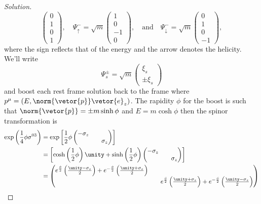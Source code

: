 \begin{proof}[Solution]
\begin{equation*}
\begin{pmatrix}
           0 \\ 1\\0 \\ 1
       \end{pmatrix},
       \quad
       \Psi^-_\uparrow = \sqrt{m} \begin{pmatrix}
           1 \\ 0\\-1 \\ 0
       \end{pmatrix},
       \quad\text{and}\quad
       \Psi^-_\downarrow = \sqrt{m} \begin{pmatrix}
           0 \\ 1\\0 \\-1
       \end{pmatrix},
   \end{equation*}
   where the sign reflects that of the energy and the arrow denotes the helicity. We'll write 
   \begin{equation*}
      \Psi^\pm_{s} = \sqrt{m}\begin{pmatrix} \xi_s\\\pm\xi_s \end{pmatrix}
   \end{equation*}
   and boost each rest frame solution back to the frame where \(p^\mu = (E, \norm{\vetor{p}} \vetor{e}_z)\). The rapidity \(\phi\) for the boost is such that \(\norm{\vetor{p}} = \pm m \sinh\phi\) and \(E = m \cosh\phi\) then the spinor transformation is
   \begin{align*}
      \exp\left(\frac14 \phi \sigma^{03}\right) 
      &= \exp\left[\frac12 \phi \begin{pmatrix}
            - \sigma_z && \\
                       && \sigma_z
      \end{pmatrix}\right]\\
      &= \left[\cosh\left(\frac12 \phi\right) \unity + \sinh\left(\frac12 \phi\right)\begin{pmatrix}
            - \sigma_z && \\
                       && \sigma_z
      \end{pmatrix}\right]\\
      &= \begin{pmatrix}
         e^{\frac{\phi}2} \left(\frac{\unity - \sigma_z}{2}\right) + e^{-\frac{\phi}2} \left(\frac{\unity + \sigma_z}{2}\right) &&\\
         && e^{\frac{\phi}2} \left(\frac{\unity + \sigma_z}2\right) + e^{-\frac{\phi}2} \left(\frac{\unity - \sigma_z}{2}\right)

\end{pmatrix}
\end{align*}
\end{proof}
